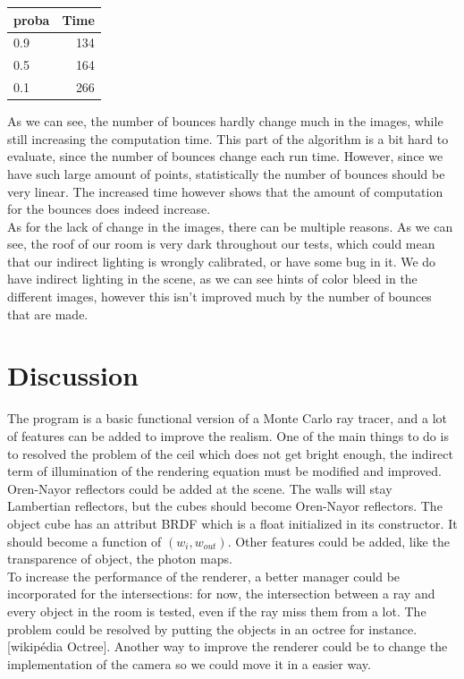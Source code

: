 \documentclass[12pt]{article}
\numberwithin{equation}{section}
\begin{document}
\begin{tabular}{| l | r |}
\hline
   proba & Time \\
\hline
   0.9 & 134 \\
\hline
   0.5 & 164 \\
\hline
   0.1 & 266 \\
\hline 
 \end{tabular}
 
 As we can see, the number of bounces hardly change much in the images, while still increasing the computation time. This part of the algorithm is a bit hard to evaluate, since the number of bounces change each run time. However, since we have such large amount of points, statistically the number of bounces should be very linear. The increased time however shows that the amount of computation for the bounces does indeed increase. \\
 
As for the lack of change in the images, there can be multiple reasons. As we can see, the roof of our room is very dark throughout our tests, which could mean that our indirect lighting is wrongly calibrated, or have some bug in it. We do have indirect lighting in the scene, as we can see hints of color bleed in the different images, however this isn't improved much by the number of bounces that are made.
 

\section{Discussion}


The program is a basic functional version of a Monte Carlo ray tracer, and a lot of features can be added to improve the realism. One of the main things to do is to resolved the problem of the ceil which does not get bright enough, the indirect term of illumination of the rendering equation must be modified and improved. Oren-Nayor reflectors could be added at the scene. The walls will stay Lambertian reflectors, but the cubes should become Oren-Nayor reflectors. The object cube has an attribut BRDF which is a float initialized in its constructor. It should become a function of $(w_i, w_{out})$. Other features could be added, like the transparence of object, the photon maps. \\	To increase the performance of the renderer, a better manager could be incorporated for the intersections: for now, the intersection between a ray and every object in the room is tested, even if the ray miss them from a lot. The problem could be resolved by putting the objects in an octree for instance.[wikipédia Octree]. Another way to improve the renderer could be to change the implementation of the camera so we could move it in a easier way.
\end{document}
